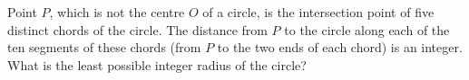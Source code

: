Point $P$, which is not the centre $O$ of a circle, is the intersection point of five distinct chords of the circle. The distance from $P$ to the circle along each of the ten segments of these chords (from $P$ to the two ends of each chord) is an integer. What is the least possible integer radius of the circle?
